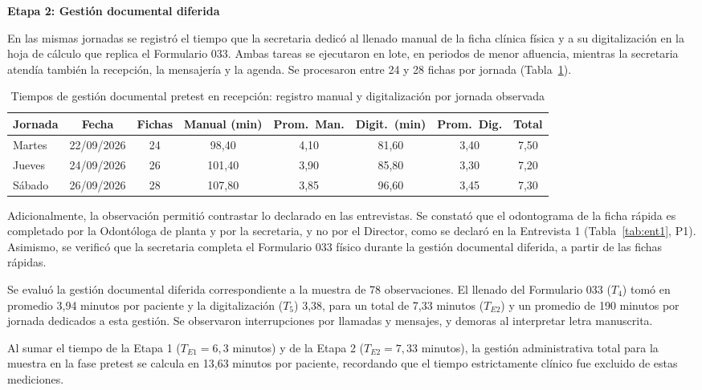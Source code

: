\textbf{Etapa 2: Gestión documental diferida}

    En las mismas jornadas se registró el tiempo que la secretaria dedicó al llenado manual de la ficha clínica física y a su digitalización en la hoja de cálculo que replica el Formulario 033. Ambas tareas se ejecutaron en lote, en periodos de menor afluencia, mientras la secretaria atendía también la recepción, la mensajería y la agenda. Se procesaron entre 24 y 28 fichas por jornada (Tabla~\ref{tab:resumen_obs_parte_b}).

\begin{table}[H]
    \centering
    \fontsize{9}{11}\selectfont
    \caption{Tiempos de gestión documental pretest en recepción: registro manual y digitalización por jornada observada}
    \label{tab:resumen_obs_parte_b}
    \renewcommand{\arraystretch}{1.1}
    \setlength{\tabcolsep}{4pt}
    \begin{tabularx}{\linewidth}{|X|c|c|c|c|c|c|c|}
        \hline
        {\footnotesize\textbf{Jornada}} &
        {\footnotesize\textbf{Fecha}} &
        {\footnotesize\textbf{Fichas}} &
        {\footnotesize\textbf{Manual (min)}} &
        {\footnotesize\textbf{Prom.\ Man.}} &
        {\footnotesize\textbf{Digit.\ (min)}} &
        {\footnotesize\textbf{Prom.\ Dig.}} &
        {\footnotesize\textbf{Total}} \\
        \hline
        Martes & 22/09/2026 & 24 & 98,40 & 4,10 & 81,60 & 3,40 & 7,50 \\
        \hline
        Jueves & 24/09/2026 & 26 & 101,40 & 3,90 & 85,80 & 3,30 & 7,20 \\
        \hline
        Sábado & 26/09/2026 & 28 & 107,80 & 3,85 & 96,60 & 3,45 & 7,30 \\
        \hline
    \end{tabularx}
\end{table}

Adicionalmente, la observación permitió contrastar lo declarado en las entrevistas. Se constató que el odontograma de la ficha rápida es completado por la Odontóloga de planta y por la secretaria, y no por el Director, como se declaró en la Entrevista 1 (Tabla~\ref{tab:ent1}, P1). Asimismo, se verificó que la secretaria completa el Formulario 033 físico durante la gestión documental diferida, a partir de las fichas rápidas.

Se evaluó la gestión documental diferida correspondiente a la muestra de 78 observaciones. El llenado del Formulario 033 ($T_4$) tomó en promedio 3,94 minutos por paciente y la digitalización ($T_5$) 3,38, para un total de 7,33 minutos ($T_{E2}$) y un promedio de 190 minutos por jornada dedicados a esta gestión. Se observaron interrupciones por llamadas y mensajes, y demoras al interpretar letra manuscrita.

Al sumar el tiempo de la Etapa 1 ($T_{E1} = 6{,}3$ minutos) y de la Etapa 2 ($T_{E2} = 7{,}33$ minutos), la gestión administrativa total para la muestra en la fase pretest se calcula en 13{,}63 minutos por paciente, recordando que el tiempo estrictamente clínico fue excluido de estas mediciones.